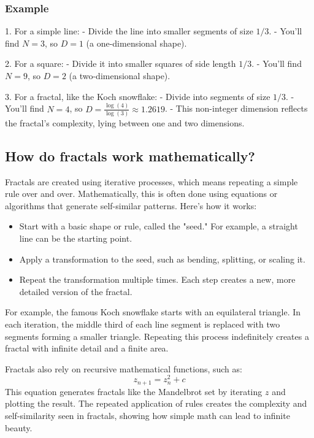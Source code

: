 \documentclass[12pt]{article}
\begin{document}
\subsubsection{Example}
1. For a simple line:
   - Divide the line into smaller segments of size \(1/3\).
   - You’ll find \(N = 3\), so \(D = 1\) (a one-dimensional shape).

2. For a square:
   - Divide it into smaller squares of side length \(1/3\).
   - You’ll find \(N = 9\), so \(D = 2\) (a two-dimensional shape).

3. For a fractal, like the Koch snowflake:
   - Divide into segments of size \(1/3\).
   - You’ll find \(N = 4\), so \(D = \frac{\log(4)}{\log(3)} \approx 1.2619\).
   - This non-integer dimension reflects the fractal's complexity, lying between one and two dimensions.

\subsection{How do fractals work mathematically?}
Fractals are created using iterative processes, which means repeating a simple rule over and over. Mathematically, this is often done using equations or algorithms that generate self-similar patterns. Here’s how it works:
\begin{itemize}
    \item Start with a basic shape or rule, called the "seed." For example, a straight line can be the starting point.
    \item Apply a transformation to the seed, such as bending, splitting, or scaling it.
    \item Repeat the transformation multiple times. Each step creates a new, more detailed version of the fractal.
\end{itemize}

For example, the famous Koch snowflake starts with an equilateral triangle. In each iteration, the middle third of each line segment is replaced with two segments forming a smaller triangle. Repeating this process indefinitely creates a fractal with infinite detail and a finite area.

Fractals also rely on recursive mathematical functions, such as:
\[
z_{n+1} = z_n^2 + c
\]
This equation generates fractals like the Mandelbrot set by iterating \( z \) and plotting the result. The repeated application of rules creates the complexity and self-similarity seen in fractals, showing how simple math can lead to infinite beauty.
\end{document}
